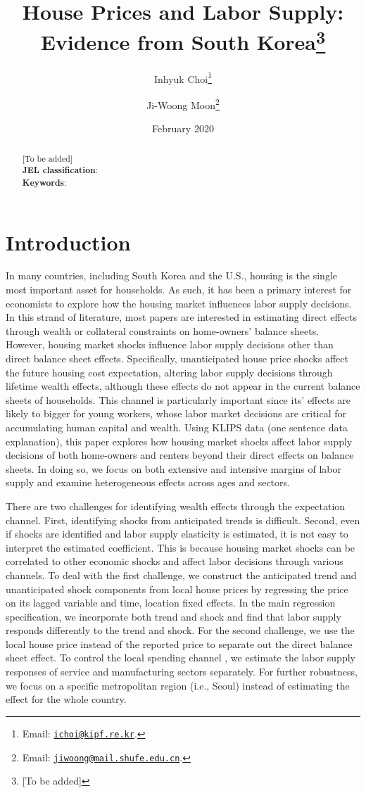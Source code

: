 \documentclass[10pt]{article}
\title{House Prices and Labor Supply: Evidence from South Korea\thanks{[To be added]}}
\author{
    Inhyuk Choi\thanks{Email: \texttt{\href{mailto:ichoi@kipf.re.kr}{ichoi@kipf.re.kr}}.}
    \and
    Ji-Woong Moon\thanks{Email: \texttt{\href{mailto:jiwoong@mail.shufe.edu.cn}{jiwoong@mail.shufe.edu.cn}}.}
    }
\date{February 2020}
\theoremstyle{definition}
\theoremstyle{remark}
\begin{document}
\maketitle

\begin{abstract}
    [To be added] \\
    \textbf{JEL classification}: \\
    \textbf{Keywords}: 
\end{abstract}

\newpage

\section{Introduction}\label{sec:intro}
In many countries, including South Korea and the U.S., housing is the single most important asset for households. As such, it has been a primary interest for economists to explore how the housing market influences labor supply decisions. In this strand of literature, most papers are interested in estimating direct effects through wealth or collateral constraints on home-owners' balance sheets. However, housing market shocks influence labor supply decisions other than direct balance sheet effects. Specifically, unanticipated house price shocks affect the future housing cost expectation, altering labor supply decisions through lifetime wealth effects, although these effects do not appear in the current balance sheets of households. This channel is particularly important since its' effects are likely to bigger for young workers, whose labor market decisions are critical for accumulating human capital and wealth. Using KLIPS data (one sentence data explanation), this paper explores how housing market shocks affect labor supply decisions of both home-owners and renters beyond their direct effects on balance sheets. In doing so, we focus on both extensive and intensive margins of labor supply and examine heterogeneous effects across ages and sectors. 

There are two challenges for identifying wealth effects through the expectation channel. First, identifying shocks from anticipated trends is difficult. Second, even if shocks are identified and labor supply elasticity is estimated, it is not easy to interpret the estimated coefficient. This is because housing market shocks can be correlated to other economic shocks and affect labor decisions through various channels. To deal with the first challenge, we construct the anticipated trend and unanticipated shock components from local house prices by regressing the price on its lagged variable and time, location fixed effects. In the main regression specification, we incorporate both trend and shock and find that labor supply responds differently to the trend and shock. For the second challenge, we use the local house price instead of the reported price to separate out the direct balance sheet effect. To control the local spending channel \citep{ms2014}, we estimate the labor supply responses of service and manufacturing sectors separately. For further robustness, we focus on a specific metropolitan region (i.e., Seoul) instead of estimating the effect for the whole country.
\end{document}
